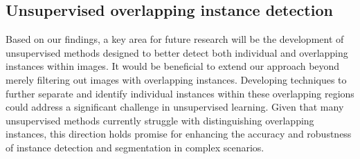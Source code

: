 \subsection{Unsupervised overlapping instance detection}
Based on our findings, a key area for future research will be the development of unsupervised methods designed to better detect both individual and overlapping instances within images. It would be beneficial to extend our approach beyond merely filtering out images with overlapping instances. Developing techniques to further separate and identify individual instances within these overlapping regions could address a significant challenge in unsupervised learning. Given that many unsupervised methods currently struggle with distinguishing overlapping instances, this direction holds promise for enhancing the accuracy and robustness of instance detection and segmentation in complex scenarios.


